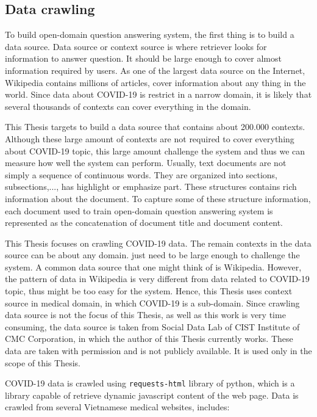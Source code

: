 \documentclass[12pt, sort&compress]{report}
\begin{document}
\subsection{Data crawling}
To build open-domain question answering system, the first thing is to build a data source. Data source or context source is where retriever looks for information to answer question. It should be large enough to cover almost information required by users. As one of the largest data source on the Internet, Wikipedia contains millions of articles, cover information about any thing in the world. Since data about COVID-19 is restrict in a narrow domain, it is likely that several thousands of contexts can cover everything in the domain.
\par 
\par This Thesis targets to build a data source that contains about 200.000 contexts. Although these large amount of contexts are not required to cover everything about COVID-19 topic, this large amount challenge the system and thus we can measure how well the system can perform. Usually, text documents are not simply a sequence of continuous words. They are organized into sections, subsections,..., has highlight or emphasize part. These structures contains rich information about the document. To capture some of these structure information, each document used to train open-domain question answering system is represented as the concatenation of document title and document content.
\par This Thesis focuses on crawling COVID-19 data. The remain contexts in the data source can be about any domain. just need to be large enough to challenge the system. A common data source that one might think of is Wikipedia. However, the pattern of data in Wikipedia is very different from data related to COVID-19 topic, thus might be too easy for the system. Hence, this Thesis uses context source in medical domain, in which COVID-19 is a sub-domain. Since crawling data source is not the focus of this Thesis, as well as this work is very time consuming, the data source is taken from Social Data Lab of CIST Institute of CMC Corporation, in which the author of this Thesis currently works. These data are taken with permission and is not publicly available. It is used only in the scope of this Thesis.
\par COVID-19 data is crawled using {\tt requests-html} library of python, which is a library capable of retrieve dynamic javascript content of the web page. Data is crawled from several Vietnamese medical websites, includes:
\end{document}

